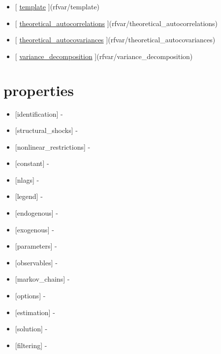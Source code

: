 \documentclass[letterpaper,10pt,english]{sphinxmanual}
\begin{document}
\begin{itemize}
\item {} 
{[} {\hyperref[classes/models/@rfvar/rfvar:template]{template}} {]}(rfvar/template)

\item {} 
{[} {\hyperref[classes/models/@rfvar/rfvar:theoretical-autocorrelations]{theoretical\_autocorrelations}} {]}(rfvar/theoretical\_autocorrelations)

\item {} 
{[} {\hyperref[classes/models/@rfvar/rfvar:theoretical-autocovariances]{theoretical\_autocovariances}} {]}(rfvar/theoretical\_autocovariances)

\item {} 
{[} {\hyperref[classes/models/@rfvar/rfvar:variance-decomposition]{variance\_decomposition}} {]}(rfvar/variance\_decomposition)

\end{itemize}


\section{properties}
\label{classes/models/@rfvar/rfvar:properties}\begin{itemize}
\item {} 
{[}identification{]} -

\item {} 
{[}structural\_shocks{]} -

\item {} 
{[}nonlinear\_restrictions{]} -

\item {} 
{[}constant{]} -

\item {} 
{[}nlags{]} -

\item {} 
{[}legend{]} -

\item {} 
{[}endogenous{]} -

\item {} 
{[}exogenous{]} -

\item {} 
{[}parameters{]} -

\item {} 
{[}observables{]} -

\item {} 
{[}markov\_chains{]} -

\item {} 
{[}options{]} -

\item {} 
{[}estimation{]} -

\item {} 
{[}solution{]} -

\item {} 
{[}filtering{]} -

\end{itemize}
\end{document}
